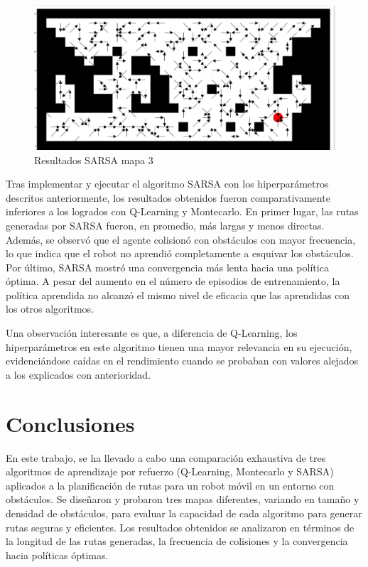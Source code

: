 \documentclass[conference,a4paper]{IEEEtran}
\begin{document}
\begin{figure}[h]
  \centering
  \includegraphics[scale=0.25]{resultado_sarsa_mapa_3}
  \caption{Resultados SARSA mapa 3}
  \label{fig:resultado_sarsa_mapa_3}
\end{figure}

Tras implementar y ejecutar el algoritmo SARSA con los hiperparámetros descritos anteriormente, los resultados obtenidos fueron comparativamente inferiores a los logrados con Q-Learning y Montecarlo. 
En primer lugar, las rutas generadas por SARSA fueron, en promedio, más largas y menos directas. Además, se observó que el agente colisionó con obstáculos con mayor frecuencia, lo que indica que el robot no aprendió completamente a esquivar los obstáculos. Por último, SARSA mostró una convergencia más lenta hacia una política óptima. 
A pesar del aumento en el número de episodios de entrenamiento, la política aprendida no alcanzó el mismo nivel de eficacia que las aprendidas con los otros algoritmos.\newline

Una observación interesante es que, a diferencia de Q-Learning, los hiperparámetros en este algoritmo tienen una mayor relevancia en su ejecución, evidenciándose caídas en el rendimiento cuando se probaban con valores alejados a los explicados con anterioridad.

\section{Conclusiones}

En este trabajo, se ha llevado a cabo una comparación exhaustiva de tres algoritmos de aprendizaje por refuerzo (Q-Learning, Montecarlo y SARSA) aplicados a la planificación de rutas para un robot móvil en un entorno con obstáculos.
Se diseñaron y probaron tres mapas diferentes, variando en tamaño y densidad de obstáculos, para evaluar la capacidad de cada algoritmo para generar rutas seguras y eficientes. Los resultados obtenidos se analizaron 
en términos de la longitud de las rutas generadas, la frecuencia de colisiones y la convergencia hacia políticas óptimas.\newline
\end{document}
